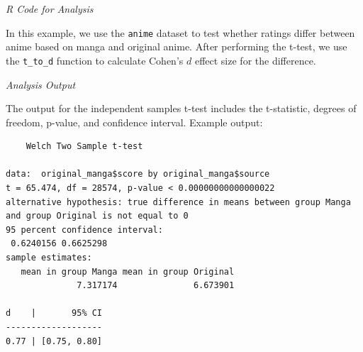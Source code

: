 \documentclass[
]{book}
\newenvironment{Shaded}{\begin{snugshade}}{\end{snugshade}}
\newcommand{\AttributeTok}[1]{\textcolor[rgb]{0.13,0.29,0.53}{#1}}
\newcommand{\CommentTok}[1]{\textcolor[rgb]{0.56,0.35,0.01}{\textit{#1}}}
\newcommand{\FunctionTok}[1]{\textcolor[rgb]{0.13,0.29,0.53}{\textbf{#1}}}
\newcommand{\NormalTok}[1]{#1}
\newcommand{\OtherTok}[1]{\textcolor[rgb]{0.56,0.35,0.01}{#1}}
\newcommand{\SpecialCharTok}[1]{\textcolor[rgb]{0.81,0.36,0.00}{\textbf{#1}}}
\newcommand{\StringTok}[1]{\textcolor[rgb]{0.31,0.60,0.02}{#1}}
\begin{document}
\emph{R Code for Analysis}

In this example, we use the \texttt{anime} dataset to test whether ratings differ between anime based on manga and original anime. After performing the t-test, we use the \texttt{t\_to\_d} function to calculate Cohen's \(d\) effect size for the difference.

\begin{Shaded}
\end{Shaded}

\emph{Analysis Output}

The output for the independent samples t-test includes the t-statistic, degrees of freedom, p-value, and confidence interval. Example output:

\begin{verbatim}
    Welch Two Sample t-test

data:  original_manga$score by original_manga$source
t = 65.474, df = 28574, p-value < 0.00000000000000022
alternative hypothesis: true difference in means between group Manga and group Original is not equal to 0
95 percent confidence interval:
 0.6240156 0.6625298
sample estimates:
   mean in group Manga mean in group Original 
              7.317174               6.673901 

d    |       95% CI
-------------------
0.77 | [0.75, 0.80]
\end{verbatim}
\end{document}

